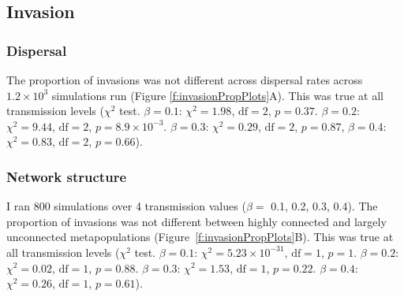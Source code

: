 







































\subsection{Invasion}


\subsubsection{Dispersal}


The proportion of invasions was not different across dispersal rates across \ensuremath{1.2\times 10^{3}} simulations run (Figure \ref{f:invasionPropPlots}A).
This was true at all transmission levels ($\chi^2$ test. $\beta = 0.1$: $\chi^2 = 1.98$, $\text{df} = 2$, $p = 0.37$. $\beta = 0.2$: $\chi^2 = 9.44$, $\text{df} = 2$, $p = \ensuremath{8.9\times 10^{-3}}$. $\beta = 0.3$: $\chi^2 = 0.29$, $\text{df} = 2$, $p = 0.87$, $\beta = 0.4$: $\chi^2 = 0.83$, $\text{df} = 2$, $p = 0.66$).


\subsubsection{Network structure}

I ran 800 simulations over 4 transmission values ($\beta = $ 0.1, 0.2, 0.3, 0.4).
The proportion of invasions was not different between highly connected and largely unconnected metapopulations (Figure~\ref{f:invasionPropPlots}B). 
This was true at all transmission levels ($\chi^2$ test. $\beta = 0.1$: $\chi^2 = \ensuremath{5.23\times 10^{-31}}$, $\text{df} = 1$, $p = 1$. $\beta = 0.2$: $\chi^2 = 0.02$, $\text{df} = 1$, $p = 0.88$. $\beta = 0.3$: $\chi^2 = 1.53$, $\text{df} = 1$, $p = 0.22$. $\beta = 0.4$: $\chi^2 = 0.26$, $\text{df} = 1$, $p = 0.61$).


